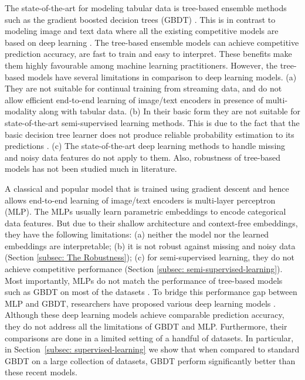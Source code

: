 The state-of-the-art for modeling tabular data is tree-based ensemble methods such as the gradient boosted decision trees (GBDT) \citep{chen2016xgboost, prokhorenkova2018catboost}. This is in contrast to modeling image and text data where 
all the existing competitive models are based on deep learning \citep{sandler2018mobilenetv2, Devlin2019BERTPO}. 
The tree-based ensemble models can achieve competitive prediction accuracy, are fast to train and easy to interpret. These benefits make them highly favourable among machine learning practitioners. However,
the tree-based models have several limitations in comparison to deep learning models. 
(a) They are not suitable for continual training from streaming data, and do not allow efficient end-to-end learning of image/text encoders in presence of multi-modality along with tabular data. 
(b) In their basic form they are not suitable for state-of-the-art semi-supervised learning methods. This is due to the fact that the basic decision tree learner does not produce reliable probability estimation to its predictions  \citep{Tanha2017SemisupervisedSF}.
(c) The state-of-the-art deep learning methods \citep{Devlin2019BERTPO} to handle missing and noisy data features do not apply to them. Also, robustness of tree-based models has not been studied much in literature. 

A classical and popular model that is trained using gradient descent and hence allows end-to-end learning of image/text encoders is multi-layer perceptron (MLP). %
The MLPs usually learn parametric embeddings to encode categorical data features. But due  to  their  shallow  architecture and context-free embeddings,  they  have  the  following limitations: 
(a) neither the model nor the learned embeddings are interpretable; (b) it is not robust against missing and noisy data (Section \ref{subsec: The Robustness}); 
(c) for semi-supervised learning, they do not achieve competitive performance (Section \ref{subsec: semi-supervised-learning}). %
Most importantly, MLPs do not match the performance of tree-based models such as GBDT on most of the datasets \citep{arik2019tabnet}. To bridge this performance gap between MLP and GBDT, researchers have proposed various deep learning models \citep{song_autoint_2019, cheng2016wide, arik2019tabnet, guo_deepfm_2018}. Although these deep learning models achieve comparable prediction accuracy, 
they do not address all the limitations of GBDT and MLP.  
Furthermore, their comparisons are done in a limited setting of a handful of datasets. In particular, in Section~\ref{subsec: supervised-learning} we show that when compared to standard GBDT on a large collection of datasets, GBDT perform significantly better than these recent models. %


